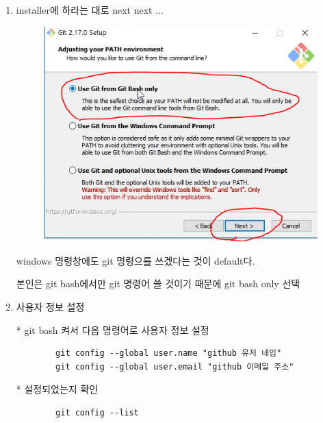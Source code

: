 \documentclass[a4paper]{article}
\begin{document}
\begin{enumerate}
		
		
		\item installer에 하라는 대로 next next ...
		
		\begin{figure}[htbp]
			\begin{center}
				\includegraphics[scale=0.5]{source/gitbashonly}
			\end{center}
		\end{figure}
		
		
		windows 명령창에도 git 명령으를 쓰겠다는 것이 default다.
		
		본인은 git bash에서만 git 명령어 쓸 것이기 때문에 git bash only 선택\\
		
		
		
		\item 사용자 정보 설정
		
		* git bash 켜서 다음 명령어로 사용자 정보 설정
		
		\begin{verbatim}
		git config --global user.name "github 유저 네임"
		git config --global user.email "github 이메일 주소"
		\end{verbatim}
		* 설정되었는지 확인
		
		\begin{verbatim}
		git config --list
		\end{verbatim}
		
		
		
	\end{enumerate}
	
	
	\newpage
	
\end{document}
